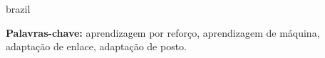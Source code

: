\begin{resumo}[Resumo]
\begin{otherlanguage*}{brazil}
%
%
%
%

\vspace*{2ex}
\textbf{Palavras-chave: } aprendizagem por reforço, aprendizagem de máquina, adaptação de enlace, adaptação de posto.

\end{otherlanguage*}
\end{resumo}
